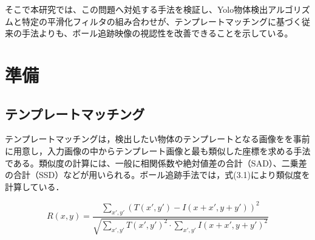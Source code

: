 \documentclass[11pt,a4j]{jreport}
\begin{document}


そこで本研究では、この問題へ対処する手法を検証し、Yolo物体検出アルゴリズムと特定の平滑化フィルタの組み合わせが、テンプレートマッチングに基づく従来の手法よりも、ボール追跡映像の視認性を改善できることを示している。

\chapter{準備}
\section{テンプレートマッチング}
テンプレートマッチングは，検出したい物体のテンプレートとなる画像をを事前に用意し，入力画像の中からテンプレート画像と最も類似した座標を求める手法である。\cite{画像処理}類似度の計算には、一般に相関係数や絶対値差の合計（SAD）、二乗差の合計（SSD）などが用いられる。ボール追跡手法では，式(3.1)により類似度を計算している．\cite{画像解析}

\begin{equation}
    R(x, y) = \frac{\sum_{x',y'} \left( T(x', y') - I(x + x', y + y') \right)^2}
    {\sqrt{\sum_{x',y'} T(x', y')^2 \cdot \sum_{x',y'} I(x + x', y + y')^2}}
\end{equation}
\end{document}
